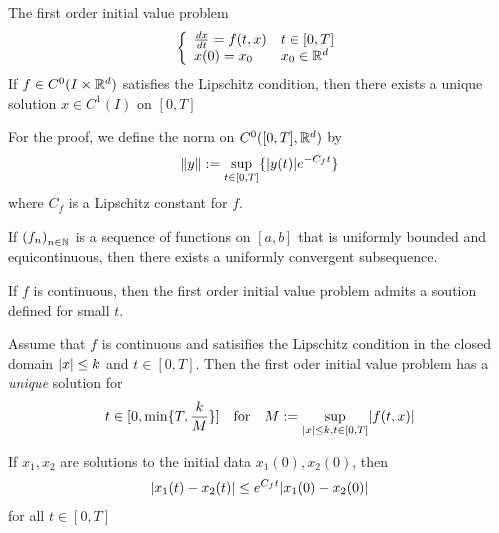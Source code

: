 \begin{thm}
  The first order initial value problem
  \begin{align*}
    \left\{\begin{array}{ll}
        \frac{d x}{d t} = f(t,x)& t \in [0,T] \\
        x(0) = x_0 & x_0 \in \mathbb{R}^{d}
    \end{array} \right.
  \end{align*}
  If $f \in C^{0}(I \times \mathbb{R}^{d})$ satisfies the Lipschitz condition, then there exists a unique solution $x \in C^{1}(I)$ on $[0,T]$
\end{thm}

For the proof, we define the norm on $C^{0}([0,T],\mathbb{R}^{d})$ by
\begin{align*}
  \|y\| := \sup_{t \in [0,T]} \{\vert y(t)\vert e^{-C_f t}\}
\end{align*}
where $C_f$ is a Lipschitz constant for $f$.


\begin{thm}
  If $\left(f_{n}\right)_{n \in \mathbb{N}}$ is a sequence of functions on $[a,b]$ that is uniformly bounded and equicontinuous, then there exists a uniformly convergent subsequence.
\end{thm}

\begin{thm}
  If $f$ is continuous, then the first order initial value problem admits a soution defined for small $t$.
\end{thm}

\begin{thm}[]
  Assume that $f$ is continuous and satisifies the Lipschitz condition in the closed domain $\vert x\vert \leq k$ and $t \in [0,T]$. Then the first oder initial value problem has a \emph{unique} solution for
  \begin{align*}
    t \in [0, \min \{T, \frac{k}{M}\}] \quad \text{for} \quad M := \sup_{\abs{x} \leq k, t \in[0,T]} \abs{f(t,x)}
  \end{align*}
\end{thm}


\begin{thm}
  If $x_1, x_2$ are solutions to the initial data $x_1(0), x_2(0)$, then
  \begin{align*}
    \vert x_1(t) - x_2(t)\vert \leq e^{C_f t}\vert x_1(0) - x_2(0)\vert
  \end{align*}
  for all $t \in [0,T]$
\end{thm}

